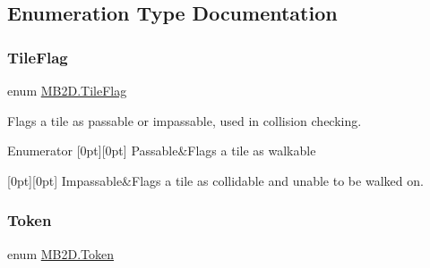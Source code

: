\subsection{Enumeration Type Documentation}
\hypertarget{namespace_m_b2_d_a3ff821c2c17b424864d890d0b26536ea}{}\label{namespace_m_b2_d_a3ff821c2c17b424864d890d0b26536ea} 
\subsubsection{\texorpdfstring{Tile\+Flag}{TileFlag}}
{\footnotesize\ttfamily enum \hyperlink{namespace_m_b2_d_a3ff821c2c17b424864d890d0b26536ea}{M\+B2\+D.\+Tile\+Flag}\hspace{0.3cm}{\ttfamily [strong]}}



Flags a tile as passable or impassable, used in collision checking. 

\begin{DoxyEnumFields}{Enumerator}
[0pt][0pt]{}\hypertarget{namespace_m_b2_d_a3ff821c2c17b424864d890d0b26536eaa01bb7f8bb1804fb74130d34c8c977a99}{}\label{namespace_m_b2_d_a3ff821c2c17b424864d890d0b26536eaa01bb7f8bb1804fb74130d34c8c977a99} 
Passable&Flags a tile as walkable \\
\hline

[0pt][0pt]{}\hypertarget{namespace_m_b2_d_a3ff821c2c17b424864d890d0b26536eaa02518d4f54df131d84d3b77bcb2bdce4}{}\label{namespace_m_b2_d_a3ff821c2c17b424864d890d0b26536eaa02518d4f54df131d84d3b77bcb2bdce4} 
Impassable&Flags a tile as collidable and unable to be walked on. \\
\hline

\end{DoxyEnumFields}
\hypertarget{namespace_m_b2_d_ab170e7e7db86e5ccb0ae156c0d9a6002}{}\label{namespace_m_b2_d_ab170e7e7db86e5ccb0ae156c0d9a6002} 
\subsubsection{\texorpdfstring{Token}{Token}}
{\footnotesize\ttfamily enum \hyperlink{namespace_m_b2_d_ab170e7e7db86e5ccb0ae156c0d9a6002}{M\+B2\+D.\+Token}\hspace{0.3cm}{\ttfamily [strong]}}




